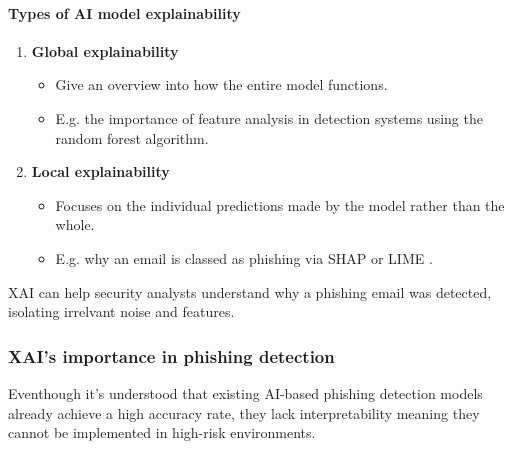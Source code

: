 \paragraph{Types of AI model explainability}
\begin{enumerate}
    \item \textbf{Global explainability}
    \begin{itemize}
        \item Give an overview into how the entire model functions.
        \item E.g. the importance of feature analysis in detection systems using the random forest algorithm.
    \end{itemize}
    \item \textbf{Local explainability}
    \begin{itemize}
        \item Focuses on the individual predictions made by the model rather than the whole.
        \item E.g. why an email is classed as phishing via SHAP or LIME \citep{lundberg2017unified}.
    \end{itemize}
\end{enumerate}

\noindent XAI can help security analysts understand why a phishing email was detected, isolating irrelvant noise and features.

\subsubsection*{XAI's importance in phishing detection}
Eventhough it's understood that existing AI-based phishing detection models already achieve a high accuracy rate, they lack interpretability meaning they cannot be implemented in high-risk environments.

